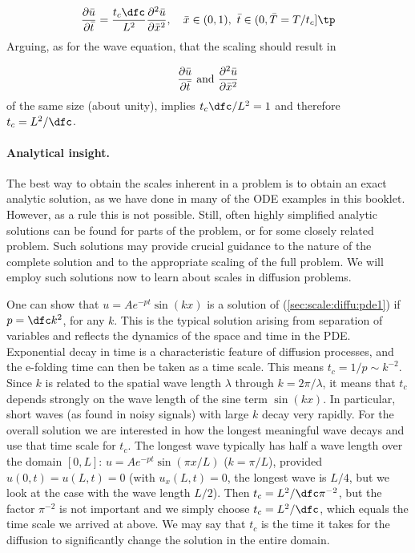 \documentclass[graybox,envcountchap,sectrefs,final]{svmonodo}
\begin{document}
\[
\frac{\partial \bar u}{\partial \bar t} =
\frac{t_c\dfc}{L^2}
\frac{\partial^2 \bar u}{\partial \bar x^2}, \quad  \bar x\in (0,1),\ \bar t\in (0,\bar T = T/t_c]\tp
\label{sec:scale:diffu:pde1:d0}
\]
Arguing, as for the wave equation, that the scaling should result in

\[ \frac{\partial \bar u}{\partial \bar t}\hbox{ and }
\frac{\partial^2 \bar u}{\partial \bar x^2}\]
of the same size (about unity),
implies $t_c\dfc/L^2=1$ and therefore $t_c = L^2/\dfc$.

\paragraph{Analytical insight.}
The best way to obtain the scales inherent in a problem is to obtain
an exact analytic solution, as we have done in many of the ODE
examples in this booklet. However, as a rule this is not possible.
Still, often highly
simplified analytic solutions can be found for parts of the problem,
or for some closely related problem. Such solutions may provide
crucial guidance to the nature of the complete solution and to the
appropriate scaling of the full problem. We will employ such solutions
now to learn about scales in diffusion problems.

One can show that $u=Ae^{-pt}\sin (kx)$ is a solution of
(\ref{sec:scale:diffu:pde1}) if $p=\dfc k^2$, for any $k$.
This is the typical solution arising from separation of variables
and reflects the dynamics of the space and time in the PDE.
Exponential decay in
time is a characteristic feature of diffusion processes, and
the e-folding time can then be taken as a time scale. This means
$t_c = 1/p \sim k^{-2}$. Since $k$ is related to the spatial
wave length $\lambda$
through $k=2\pi/\lambda$, it means that $t_c$ depends strongly on the wave
length of the sine term $\sin(kx)$.
In particular, short waves (as found in noisy signals) with
large $k$ decay very rapidly.
For the overall solution we are interested in how the longest meaningful
wave decays and use that time scale for $t_c$. The longest wave
typically has half a wave length over the domain $[0,L]$:
$u = Ae^{-pt}\sin(\pi x/L)$ ($k=\pi/L$), provided $u(0,t)=u(L,t)=0$
(with $u_x(L,t)=0$, the longest wave is $L/4$, but we look at the
case with the wave length $L/2$). Then $t_c=L^2/\dfc \pi^{-2}$,
but the factor $\pi^{-2}$ is not important and we simply choose
$t_c=L^2/\dfc$, which equals the time scale we arrived at above.
We may say that $t_c$ is the time it takes for the diffusion to
significantly change the solution in the entire domain.
\end{document}
